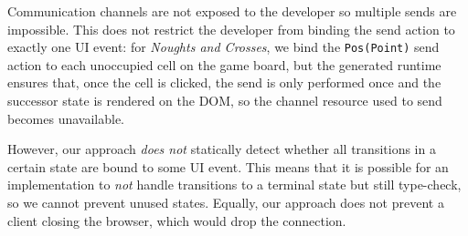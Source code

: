 Communication channels are not exposed to the developer so multiple sends are
impossible.
This does not restrict the developer from binding the send action to exactly
one UI event: for \textit{Noughts and Crosses}, we bind the \texttt{Pos(Point)}
send action to each unoccupied cell on the game board, but the generated
runtime ensures that, once the cell is clicked, the send is only performed once
and the successor state is rendered on the DOM, so the channel resource used to
send becomes unavailable.

However, our approach \textit{does not} statically detect whether all
transitions in a certain state are bound to some UI event.
This means that it is possible for an implementation to \textit{not} handle
transitions to a terminal state but still type-check, so we cannot prevent
unused states. Equally, our approach does not prevent a client closing the browser, which would drop the connection.

